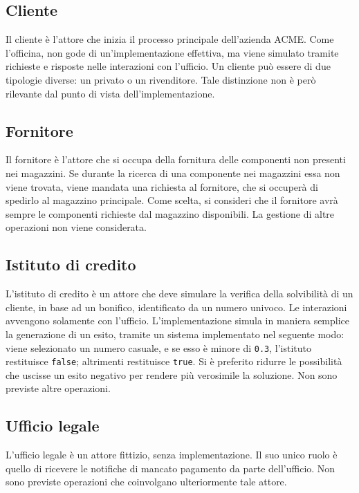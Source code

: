 \subsection{Cliente}
Il cliente \`e l'attore che inizia il processo principale dell'azienda
ACME.
Come l'officina, non gode di un'implementazione effettiva, ma viene
simulato tramite richieste e risposte nelle interazioni con l'ufficio.
Un cliente pu\`o essere di due tipologie diverse: un privato o un
rivenditore. Tale distinzione non \`e per\`o rilevante dal punto di
vista dell'implementazione.

\subsection{Fornitore}
Il fornitore \`e l'attore che si occupa della fornitura delle componenti
non presenti nei magazzini. Se durante la ricerca di una componente nei
magazzini essa non viene trovata, viene mandata una richiesta al
fornitore, che si occuper\`a di spedirlo al magazzino principale. Come
scelta, si consideri che il fornitore avr\`a sempre le componenti
richieste dal magazzino disponibili. La gestione di altre operazioni non
viene considerata.

\subsection{Istituto di credito}
L'istituto di credito \`e un attore che deve simulare la verifica della
solvibilit\`a di un cliente, in base ad un bonifico, identificato da un
numero univoco. Le interazioni avvengono solamente con l'ufficio.
L'implementazione simula in maniera semplice la generazione di un esito,
tramite un sistema implementato nel seguente modo: viene selezionato un
numero casuale, e se esso \`e minore di {\tt 0.3}, l'istituto
restituisce {\tt false}; altrimenti restituisce {\tt true}. Si \`e
preferito ridurre le possibilit\`a che uscisse un esito negativo per
rendere pi\`u verosimile la soluzione. Non sono previste altre
operazioni.

\subsection{Ufficio legale}
L'ufficio legale \`e un attore fittizio, senza implementazione. Il suo
unico ruolo \`e quello di ricevere le notifiche di mancato pagamento da
parte dell'ufficio. Non sono previste operazioni che coinvolgano
ulteriormente tale attore.
